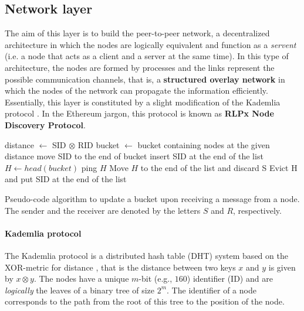 \subsection{Network layer}
\label{sec:network-layer}

The aim of this layer is to build the peer-to-peer network, a decentralized
architecture in which the nodes are logically equivalent and function as a
\emph{servent} (i.e. a node that acts as a client and a server at the same
time). In this type of architecture, the nodes are formed by processes and the
links represent the possible communication channels, that is, a
\textbf{structured overlay network} \cite{van2017distributed} in which the nodes
of the network can propagate the information efficiently. Essentially, this
layer is constituted by a slight modification of the Kademlia protocol
\cite{bib:kademlia}. In the Ethereum jargon, this protocol is known as
\textbf{RLPx Node Discovery Protocol}.

\begin{algorithm}
\begin{algorithmic}

	\State distance $\gets$ SID $\otimes$ RID
	\State bucket $\gets$ bucket containing nodes at the given distance
	\State move SID to the end of bucket
	\Else
	\State insert SID at the end of the list
	\Else
	\State $H \gets head(bucket)$
	\State ping $H$
	\State Move $H$ to the end of the list and discard S
	\Else 
	\State Evict H and put SID at the end of the list
	\EndIf
	\EndIf
	\EndIf
\end{algorithmic}
\caption{Pseudo-code algorithm to update a bucket upon receiving a message from
a node. The sender and the receiver are denoted by the letters $S$ and $R$,
respectively.}
\label{alg:kademlia:update}
\end{algorithm}


\paragraph{Kademlia protocol}
The Kademlia protocol is a distributed hash table (DHT) system based on the
XOR-metric for distance \cite{bib:kademlia}, that is the distance between two
keys $x$ and $y$ is given by $x \otimes y$. 
The nodes have a unique $m$-bit (e.g., $160$) identifier (ID) and are 
\emph{logically} the leaves of a binary tree of size $2^m$. 
The identifier of a node corresponds
to the path from the root of this tree to the position of the node.


